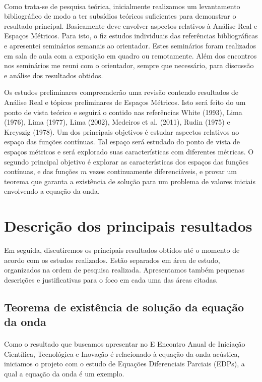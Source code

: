 \documentclass[a4paper,12pt]{article}
\begin{document}
\paragraph*{}

Como trata-se de pesquisa teórica, inicialmente realizamos um
levantamento bibliográfico de modo a ter subsídios teóricos suficientes para
demonstrar o resultado principal. Basicamente deve envolver aspectos relativos à
Análise Real e Espaços Métricos. Para isto, o fiz estudos individuais das
referências bibliográficas e apresentei seminários semanais ao orientador.
Estes seminários foram realizados em sala de aula com a exposição em quadro ou
remotamente. Além dos encontros nos seminários me reuni com o
orientador, sempre que necessário, para discussão e análise dos resultados obtidos.


Os estudos preliminares compreenderão uma revisão contendo resultados de
Análise Real e tópicos preliminares de Espaços Métricos. Isto será feito do um ponto
de vista teórico e seguirá o contido nas referências White (1993), Lima (1976), Lima
(1977), Lima (2002), Medeiros et al. (2011), Rudin (1975) e Kreyszig (1978). Um dos
principais objetivos é estudar aspectos relativos ao espaço das funções contínuas. Tal
espaço será estudado do ponto de vista de espaços métricos e será explorado suas
características com diferentes métricas. O segundo principal objetivo é explorar as
características dos espaços das funções contínuas, e das funções $m$ vezes
continuamente diferenciáveis, e provar um teorema que garanta a existência de
solução para um problema de valores iniciais envolvendo a equação da onda.

\section{Descrição dos principais resultados}

Em seguida, discutiremos os principais resultados obtidos até o momento de acordo com os estudos realizados.
Estão separados em área de estudo, organizados na ordem de pesquisa realizada. Apresentamos também
pequenas descrições e justificativas para o foco em cada uma das áreas citadas.

\subsection{Teorema de existência de solução da equação da onda}
\paragraph*{}
Como o resultado que buscamos apresentar no E Encontro Anual de Iniciação Científica,
Tecnológica e Inovação é relacionado à equação da onda acústica, iniciamos o projeto com o estudo de Equações Diferenciais Parciais (EDPs),
a qual a equação da onda é um exemplo.
\end{document}

